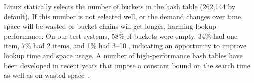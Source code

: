 Linux statically selects the number of buckets in the hash table (262,144 by default).
If this number is not selected well, or the demand changes over time,
space will be wasted or bucket chains will get longer, harming lookup performance.
On our test systems, 58\% of buckets were empty, 34\% had one item,
7\% had 2 items, and 1\% had 3--10 \dentries{},
indicating an opportunity to improve lookup time and space usage.
A number of high-performance hash tables have been developed in recent years that
impose a constant bound on the search time as well as on wasted space~\citep{cuckoo04,li14cuckoo,triplett11hash,herlihy08hopscotch}.
